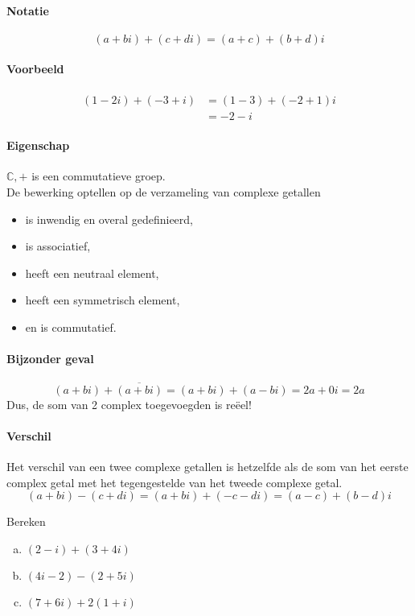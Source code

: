 \documentclass[12pt,twoside]{article}
\begin{document}
\paragraph*{Notatie}
$$(a+bi) + (c+di) = (a+c) + (b+d)i$$

\paragraph{Voorbeeld}
\begin{align*}
  (1 - 2i) + (-3 + i) &= (1 - 3) + (-2 + 1)i \\
                      &= -2-i
\end{align*}

\paragraph*{Eigenschap}
$\mathbb{C},+$ is een commutatieve groep.\\
De bewerking optellen op de verzameling van complexe getallen
\begin{itemize}
  \item is inwendig en overal gedefinieerd,
  \item is associatief,
  \item heeft een neutraal element,
  \item heeft een symmetrisch element,
  \item en is commutatief.
\end{itemize}

\paragraph*{Bijzonder geval}
$$(a+bi) + \overline{(a+bi)}=(a+bi) + (a-bi) = 2a+0i = 2a$$
Dus, de som van 2 complex toegevoegden is reëel!

\paragraph*{Verschil}
Het verschil van een twee complexe getallen is hetzelfde als de som van het eerste complex getal met het tegengestelde van het tweede complexe getal.
$$(a+bi)-(c+di)=(a+bi)+(-c-di)=(a-c)+(b-d)i$$

\begin{oefening}
  Bereken
  \begin{enumerate}[(a)]
  \itemsep1em
  \item $\displaystyle (2-i)+(3+4i)$
  \item $\displaystyle (4i-2)-(2+5i)$
  \item $\displaystyle (7+6i)+2(1+i)$
  \end{enumerate}
\end{oefening}
\end{document}
